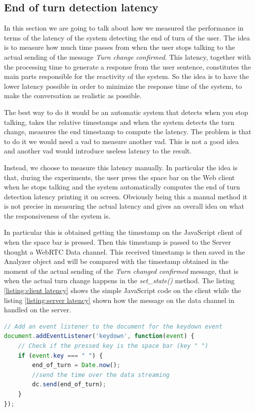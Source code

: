 \documentclass[../main.tex]{subfiles}
\begin{document}
\subsection{End of turn detection latency}

In this section we are going to talk about how we measured the performance in terms of the latency of the system detecting the end of turn of the user. The idea is to measure how much time passes from when the user stops talking to the actual sending of the message \textit{Turn change confirmed}. This latency, together with the processing time to generate a response from the user sentence, constitutes the main parts responsible for the reactivity of the system. So the idea is to have the lower latency possible in order to minimize the response time of the system, to make the conversation as realistic as possible.

The best way to do it would be an automatic system that detects when you stop talking, takes the relative timestamps and when the system detects the turn change, measures the end timestamp to compute the latency. The problem is that to do it we would need a vad to measure another vad. This is not a good idea and another vad would introduce useless latency to the result.

Instead, we choose to measure this latency manually. In particular the idea is that, during the experiments, the user press the space bar on the Web client when he stops talking and the system automatically computes the end of turn detection latency printing it on screen. Obviously being this a manual method it is not precise in measuring the actual latency and gives an overall idea on what the responsiveness of the system is. 

In particular this is obtained getting the timestamp on the JavaScript client of when the space bar is pressed. Then this timestamp is passed to the Server thought a WebRTC Data channel. This received timestamp is then saved in the Analyzer object and will be compared with the timestamp obtained in the moment of the actual sending of the \textit{Turn changed confirmed} message, that is when the actual turn change happens in the \textit{set\_state()} method. The listing \ref{listing:client latency} shows the simple JavaScript code on the client while the listing \ref{listing:server latency} shown how the message on the data channel in handled on the server.

\begin{lstlisting}[language=JavaScript, caption={Client implementation of the method to take the timestamp}]
// Add an event listener to the document for the keydown event
document.addEventListener('keydown', function(event) {
    // Check if the pressed key is the space bar (key " ")
    if (event.key === " ") {
        end_of_turn = Date.now();
        //send the time over the data streaming
        dc.send(end_of_turn);
    }
});
\end{lstlisting}
\label{listing:client latency}
\end{document}
